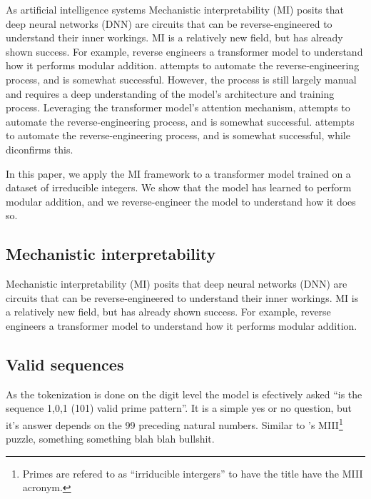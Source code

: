 \documentclass[11pt]{article} %
\begin{document}
\begin{multicols}{2}
  As artificial intelligence systems Mechanistic interpretability (MI)
  posits that deep neural networks (DNN) are circuits that can be
  reverse-engineered to understand their inner workings. MI is a
  relatively new field, but has already shown success. For example,
  \textcite{nanda2023} reverse engineers a transformer model
  \autocite{vaswani2017} to understand how it performs modular addition.
  \textcite{cover2006} attempts to automate the reverse-engineering
  process, and is somewhat successful. However, the process is still
  largely manual and requires a deep understanding of the model's
  architecture and training process. Leveraging the transformer model's
  attention mechanism, \textcite{conmy2023} attempts to automate the
  reverse-engineering process, and is somewhat successful.
  \textcite{conmy2023} attempts to automate the reverse-engineering
  process, and is somewhat successful, while \textcite{belcak2022}
  diconfirms this.

  In this paper, we apply the MI framework to a transformer model
  trained on a dataset of irreducible integers. We show that the model
  has learned to perform modular addition, and we reverse-engineer the
  model to understand how it does so.

  \subsection{Mechanistic
  interpretability}\label{mechanistic-interpretability}

  Mechanistic interpretability (MI) posits that deep neural networks
  (DNN) are circuits that can be reverse-engineered to understand their
  inner workings. MI is a relatively new field, but has already shown
  success. For example, \textcite{nanda2023} reverse engineers a
  transformer model \autocite{vaswani2017} to understand how it performs
  modular addition.

  \subsection{Valid sequences}\label{valid-sequences}

  As the tokenization is done on the digit level the model is efectively
  asked ``is the sequence 1,0,1 (101) valid prime pattern''. It is a
  simple yes or no question, but it's answer depends on the 99 preceding
  natural numbers. Similar to \textcite{hofstadter2000}'s
  MIII\footnote{Primes are refered to as ``irriducible intergers'' to
    have the title have the MIII acronym.} puzzle, something something
  blah blah bullshit.


\end{multicols}
\end{document}
